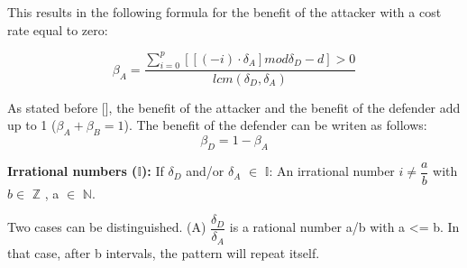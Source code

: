 This results in the following formula for the benefit of the attacker with a cost rate equal to zero:

\begin{equation}\label{first}
\beta_{A} = \dfrac{\sum_{i=0}^{p}  [[(  - i ) \cdot \delta_{A}] mod \delta_{D} - d] > 0 }{lcm(\delta_{D},\delta_{A})} 
\end{equation}

As stated before [], the benefit of the attacker and the benefit of the defender add up to 1 ($\beta_{A} + \beta_{B} = 1$). The benefit of the defender can be writen as follows:
\begin{equation}\label{first}
\beta_{D} = 1 - \beta_{A}
\end{equation}

\textbf{Irrational numbers (\(\mathbb{I}\)):} If $\delta_{D}$ and/or $\delta_{A}$ $\in$ \(\mathbb{I}\):
An irrational number $ i \neq \dfrac{a}{b}$ with $b \in$ \(\mathbb{Z}\) , a $\in$ \(\mathbb{N}\).

Two cases can be distinguished.
(A) $\dfrac{\delta_{D}}{ \delta_{A}}$ is a rational number a/b with a <= b. In that case, after b intervals, the pattern will repeat itself.

